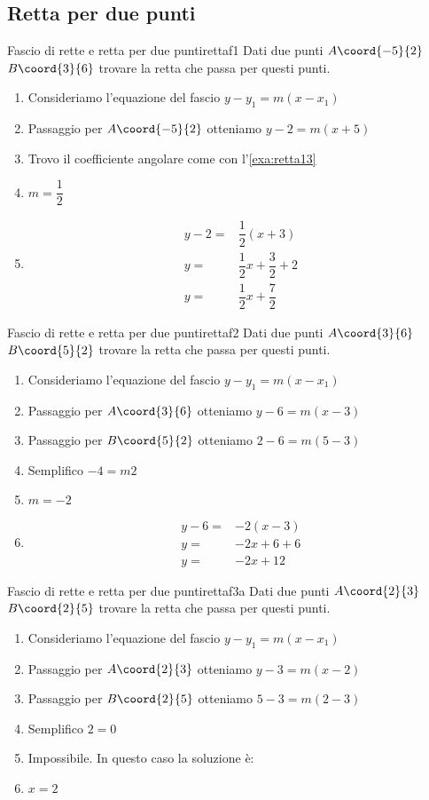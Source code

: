 \subsection{Retta per due punti}
\begin{esempiot}{Fascio di rette e retta per due punti}{rettaf1}
Dati due punti $A\coord{-5}{2}$ $B\coord{3}{6}$ trovare la retta che passa per questi punti.
\end{esempiot}
\begin{enumerate}
	\item Consideriamo l'equazione del fascio $y-y_1=m(x-x_1)$
	\item Passaggio per $A\coord{-5}{2}$ otteniamo $y-2=m(x+5)$
	\item Trovo il coefficiente angolare come con l'\cref{exa:retta13}
	\item $m=\dfrac{1}{2}$
	\item \begin{align*}
		y-2=&\dfrac{1}{2}(x+3)\\
		y=&\dfrac{1}{2}x+\dfrac{3}{2}+2\\
		y=&\dfrac{1}{2}x+\dfrac{7}{2}
	\end{align*}
\end{enumerate}
\begin{esempiot}{Fascio di rette e retta per due punti}{rettaf2}
	Dati due punti $A\coord{3}{6}$ $B\coord{5}{2}$ trovare la retta che passa per questi punti.
\end{esempiot}
\begin{enumerate}
	\item Consideriamo l'equazione del fascio $y-y_1=m(x-x_1)$
	\item Passaggio per $A\coord{3}{6}$ otteniamo $y-6=m(x-3)$
	\item Passaggio per $B\coord{5}{2}$ otteniamo $2-6=m(5-3)$
	\item Semplifico $-4=m2$
	\item $m=-2$
	\item \begin{align*}
		y-6=&-2(x-3)\\
		y=&-2x+6+6\\
		y=&-2x+12
	\end{align*}
\end{enumerate}
\begin{cesempiot}{Fascio di rette e retta per due punti}{rettaf3a}
	Dati due punti $A\coord{2}{3}$ $B\coord{2}{5}$ trovare la retta che passa per questi punti.
\end{cesempiot}
\begin{enumerate}
	\item Consideriamo l'equazione del fascio $y-y_1=m(x-x_1)$
	\item Passaggio per $A\coord{2}{3}$ otteniamo $y-3=m(x-2)$
	\item Passaggio per $B\coord{2}{5}$ otteniamo $5-3=m(2-3)$
	\item Semplifico $2=0$
	\item Impossibile. In questo caso la soluzione è:
	\item $x=2$
\end{enumerate}
